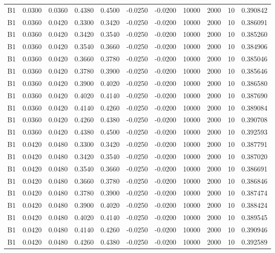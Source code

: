 \documentclass{article}
\begin{document}
\begin{longtable}{l r r r r r r r r r l}
B1 & 0.0300 & 0.0360 & 0.4380 & 0.4500 & -0.0250 & -0.0200 & 10000 & 2000 & 10 & 0.390842 \\
B1 & 0.0360 & 0.0420 & 0.3300 & 0.3420 & -0.0250 & -0.0200 & 10000 & 2000 & 10 & 0.386091 \\
B1 & 0.0360 & 0.0420 & 0.3420 & 0.3540 & -0.0250 & -0.0200 & 10000 & 2000 & 10 & 0.385260 \\
B1 & 0.0360 & 0.0420 & 0.3540 & 0.3660 & -0.0250 & -0.0200 & 10000 & 2000 & 10 & 0.384906 \\
B1 & 0.0360 & 0.0420 & 0.3660 & 0.3780 & -0.0250 & -0.0200 & 10000 & 2000 & 10 & 0.385046 \\
B1 & 0.0360 & 0.0420 & 0.3780 & 0.3900 & -0.0250 & -0.0200 & 10000 & 2000 & 10 & 0.385646 \\
B1 & 0.0360 & 0.0420 & 0.3900 & 0.4020 & -0.0250 & -0.0200 & 10000 & 2000 & 10 & 0.386580 \\
B1 & 0.0360 & 0.0420 & 0.4020 & 0.4140 & -0.0250 & -0.0200 & 10000 & 2000 & 10 & 0.387690 \\
B1 & 0.0360 & 0.0420 & 0.4140 & 0.4260 & -0.0250 & -0.0200 & 10000 & 2000 & 10 & 0.389084 \\
B1 & 0.0360 & 0.0420 & 0.4260 & 0.4380 & -0.0250 & -0.0200 & 10000 & 2000 & 10 & 0.390708 \\
B1 & 0.0360 & 0.0420 & 0.4380 & 0.4500 & -0.0250 & -0.0200 & 10000 & 2000 & 10 & 0.392593 \\
B1 & 0.0420 & 0.0480 & 0.3300 & 0.3420 & -0.0250 & -0.0200 & 10000 & 2000 & 10 & 0.387791 \\
B1 & 0.0420 & 0.0480 & 0.3420 & 0.3540 & -0.0250 & -0.0200 & 10000 & 2000 & 10 & 0.387020 \\
B1 & 0.0420 & 0.0480 & 0.3540 & 0.3660 & -0.0250 & -0.0200 & 10000 & 2000 & 10 & 0.386691 \\
B1 & 0.0420 & 0.0480 & 0.3660 & 0.3780 & -0.0250 & -0.0200 & 10000 & 2000 & 10 & 0.386846 \\
B1 & 0.0420 & 0.0480 & 0.3780 & 0.3900 & -0.0250 & -0.0200 & 10000 & 2000 & 10 & 0.387474 \\
B1 & 0.0420 & 0.0480 & 0.3900 & 0.4020 & -0.0250 & -0.0200 & 10000 & 2000 & 10 & 0.388424 \\
B1 & 0.0420 & 0.0480 & 0.4020 & 0.4140 & -0.0250 & -0.0200 & 10000 & 2000 & 10 & 0.389545 \\
B1 & 0.0420 & 0.0480 & 0.4140 & 0.4260 & -0.0250 & -0.0200 & 10000 & 2000 & 10 & 0.390946 \\
B1 & 0.0420 & 0.0480 & 0.4260 & 0.4380 & -0.0250 & -0.0200 & 10000 & 2000 & 10 & 0.392589 \\

\end{longtable}
\end{document}
